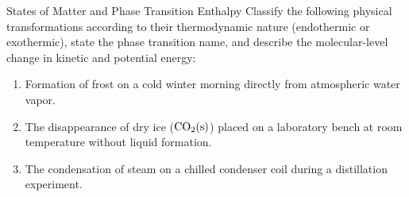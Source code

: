 \vspace{10pt}

\begin{exercise}{States of Matter and Phase Transition Enthalpy}
Classify the following physical transformations according to their thermodynamic nature (endothermic or exothermic), state the phase transition name, and describe the molecular-level change in kinetic and potential energy:
\begin{enumerate}[leftmargin=1.5em,itemsep=2pt]
  \item Formation of frost on a cold winter morning directly from atmospheric water vapor.
  \item The disappearance of dry ice ($\ce{CO2(s)}$) placed on a laboratory bench at room temperature without liquid formation.
  \item The condensation of steam on a chilled condenser coil during a distillation experiment.
\end{enumerate}
\end{exercise}

\begin{tabletworkspace}[5.0cm]
\end{tabletworkspace}


